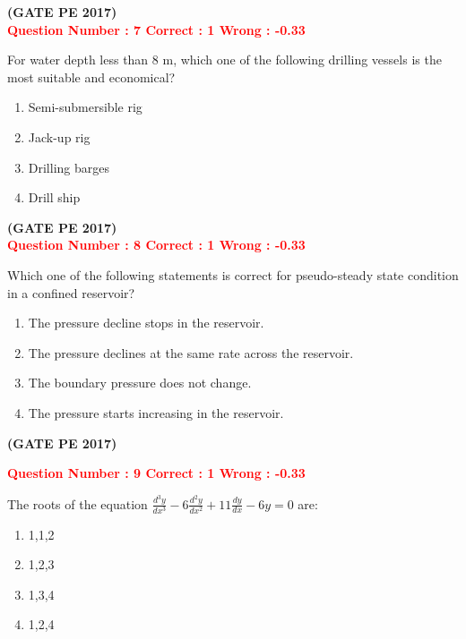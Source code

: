 \documentclass[journal,12pt,onecolumn]{article}
\begin{document}
{\hfill\textbf{(GATE PE 2017)}\\[0.6cm]



\textcolor{red}{\textbf{Question Number : 7 \hfill Correct : 1  Wrong : -0.33}}

For water depth less than 8 m, which one of the following drilling vessels is the most suitable and economical?

\begin{enumerate}[label=(\Alph*)]
    \item Semi-submersible rig
    \item Jack-up rig
    \item Drilling barges
    \item Drill ship
\end{enumerate}
\hfill\textbf{(GATE PE 2017)}\\[0.6cm]

\textcolor{red}{\textbf{Question Number : 8 \hfill Correct : 1  Wrong : -0.33}}

Which one of the following statements is correct for pseudo-steady state condition in a confined reservoir?

\begin{enumerate}[label=(\Alph*)]
    \item The pressure decline stops in the reservoir.
    \item The pressure declines at the same rate across the reservoir.
    \item The boundary pressure does not change.
    \item The pressure starts increasing in the reservoir.
\end{enumerate}

\hfill\textbf{(GATE PE 2017)}\\[0.6cm]

\newpage

\textcolor{red}{\textbf{Question Number : 9 \hfill Correct : 1  Wrong : -0.33}}

The roots of the equation 
{\LARGE$ 
\frac{d^3 y}{dx^3} - 6 \frac{d^2 y}{dx^2} + 11 \frac{dy}{dx} - 6y = 0
$ }
are:

\begin{enumerate}[label=(\Alph*)]
    \item 1,1,2
    \item 1,2,3
    \item 1,3,4
    \item 1,2,4
\end{enumerate}

}
\end{document}
